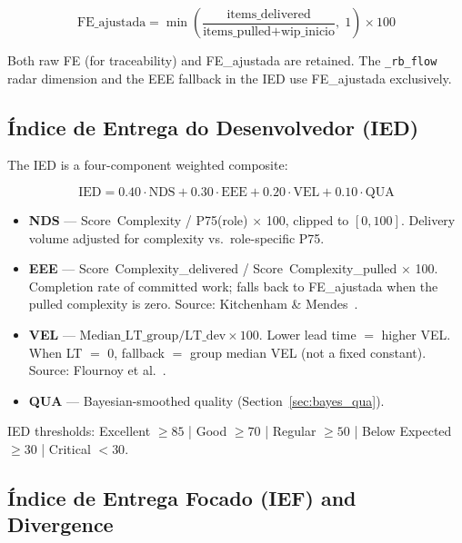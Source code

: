 \documentclass[conference]{IEEEtran}
\begin{document}
\begin{equation}
  \text{FE\_ajustada} = \min\!\left(
    \frac{\text{items\_delivered}}{\text{items\_pulled} + \text{wip\_inicio}},\;
    1 \right) \times 100
  \label{eq:fe_adj}
\end{equation}

Both raw FE (for traceability) and FE\_ajustada are retained.
The \texttt{\_rb\_flow} radar dimension and the EEE fallback in the IED
use FE\_ajustada exclusively.

\subsection{\'Indice de Entrega do Desenvolvedor (IED)}
\label{sec:ied}

The IED is a four-component weighted composite:

\begin{equation}
  \text{IED} = 0.40\cdot\text{NDS} + 0.30\cdot\text{EEE}
             + 0.20\cdot\text{VEL} + 0.10\cdot\text{QUA}
  \label{eq:ied}
\end{equation}

\begin{itemize}
  \item \textbf{NDS} --- Score~Complexity / P75(role) $\times$ 100, clipped to
    $[0,100]$. Delivery volume adjusted for complexity vs.\ role-specific P75.
  \item \textbf{EEE} --- Score~Complexity\_delivered / Score~Complexity\_pulled
    $\times$ 100. Completion rate of committed work; falls back to FE\_ajustada
    when the pulled complexity is zero. Source: Kitchenham \& Mendes~\cite{kitchenham2004}.
  \item \textbf{VEL} --- $\text{Median\_LT\_group} / \text{LT\_dev} \times 100$.
    Lower lead time $=$ higher VEL. When LT $=$ 0, fallback $=$ group median VEL
    (not a fixed constant). Source: Flournoy et al.~\cite{flournoy2025}.
  \item \textbf{QUA} --- Bayesian-smoothed quality (Section~\ref{sec:bayes_qua}).
\end{itemize}

IED thresholds: Excellent $\geq 85$ | Good $\geq 70$ | Regular $\geq 50$ |
Below Expected $\geq 30$ | Critical $< 30$.

\subsection{\'Indice de Entrega Focado (IEF) and Divergence}
\label{sec:ief}
\end{document}
